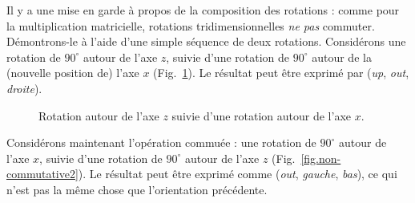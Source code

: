 Il y a une mise en garde à propos de la composition des rotations : comme pour la multiplication matricielle, rotations tridimensionnelles \emph{ne pas} commuter. Démontrons-le à l'aide d'une simple séquence de deux rotations. Considérons une rotation de $90^\circ$ autour de l'axe $z$, suivie d'une rotation de $90^\circ$ autour de la (nouvelle position de) l'axe $x$ (Fig.~\ref{fig.non-commutative1}). Le résultat peut être exprimé par (\textit{up}, \textit{out}, \textit{droite}).
\begin{figure}
\begin{center}
\hspace{2em}
\hspace{2em}
\caption{Rotation autour de l'axe $z$ suivie d'une rotation autour de l'axe $x$.}\label{fig.non-commutative1}
\end{center}
\end{figure}

Considérons maintenant l'opération commuée : une rotation de $90^\circ$ autour de l'axe $x$, suivie d'une rotation de $90^\circ$ autour de l'axe $z$ (Fig.~\ref{fig.non-commutative2}). Le résultat peut être exprimé comme (\textit{out}, \textit{gauche}, \textit{bas}), ce qui n'est pas la même chose que l'orientation précédente.


